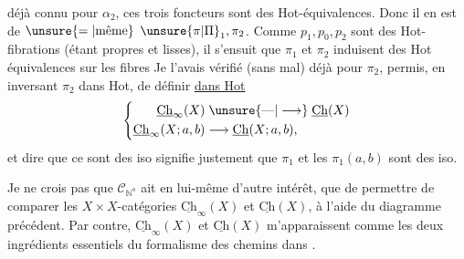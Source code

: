  déjà connu pour $\alpha_2$, ces trois foncteurs sont des Hot-équivalences. Donc il en est de $\unsure{=|\text{même}}$  $\unsure{\pi|\Pi}_1,\pi_2$. Comme $p_1,p_0,p_2$ sont des Hot-fibrations (étant propres et lisses), il s'ensuit que $\pi_1$ et $\pi_2$ induisent des Hot équivalences sur les fibres
Je l'avais vérifié (sans mal) déjà pour $\pi_2$,   permis, en inversant $\pi_2$ dans Hot, de définir \uline{dans Hot}
\[
\left\{\begin{aligned}
\underline{\mathrm{Ch}}_\infty(X)&\mathrel{\unsure{\text{---}|\longrightarrow}}\underline{\mathrm{Ch}}(X)\\
\underline{\mathrm{Ch}}_\infty(X;a,b)&\longrightarrow\underline{\mathrm{Ch}}(X;a,b),
\end{aligned}\right.
\]
et dire que ce sont des iso signifie justement que $\pi_1$ et les $\pi_1(a,b)$ sont des iso.

Je ne crois pas que $\mathcal C_{\mathbb N^o}$ ait en lui-même d'autre intérêt, que de permettre de comparer les $X\times X$-catégories $\underline{\mathrm{Ch}}_\infty(X)$ et $\underline{\mathrm{Ch}}(X)$, à l'aide du diagramme précédent. Par contre, $\underline{\mathrm{Ch}}_\infty(X)$ et $\underline{\mathrm{Ch}}(X)$ m'apparaissent comme les deux ingrédients essentiels du formalisme des chemins dans .
